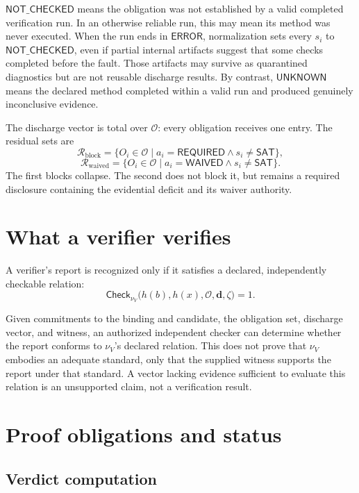 \documentclass[11pt,openany]{book}
\newcommand{\ErrorVerdict}{\mathsf{ERROR}}
\newcommand{\Waived}{\mathsf{WAIVED}}
\newcommand{\Required}{\mathsf{REQUIRED}}
\begin{document}
\(\mathsf{NOT\_CHECKED}\) means the obligation was not established by a valid
completed verification run. In an otherwise reliable run, this may mean its
method was never executed. When the run ends in \(\ErrorVerdict\), normalization
sets every \(s_i\) to \(\mathsf{NOT\_CHECKED}\), even if partial internal
artifacts suggest that some checks completed before the fault. Those artifacts
may survive as quarantined diagnostics but are not reusable discharge results.
By contrast, \(\mathsf{UNKNOWN}\) means the declared method completed within a
valid run and produced genuinely inconclusive evidence.

The discharge vector is total over \(\mathcal O\): every obligation receives
one entry. The residual sets are
\[
 \mathcal R_{\mathrm{block}}
 =\{O_i\in\mathcal O\mid a_i=\Required
       \land s_i\neq\mathsf{SAT}\},
\]
\[
 \mathcal R_{\mathrm{waived}}
 =\{O_i\in\mathcal O\mid a_i=\Waived
       \land s_i\neq\mathsf{SAT}\}.
\]
The first blocks collapse. The second does not block it, but remains a required
disclosure containing the evidential deficit and its waiver authority.

\section{What a verifier verifies}

A verifier's report is recognized only if it satisfies a declared,
independently checkable relation:
\[
 \mathsf{Check}_{\nu_V}
 \bigl(h(b),h(x),\mathcal O,\mathbf d,\zeta\bigr)=1.
\]

Given commitments to the binding and candidate, the obligation set, discharge
vector, and witness, an authorized independent checker can determine whether
the report conforms to \(\nu_V\)'s declared relation. This does not prove that
\(\nu_V\) embodies an adequate standard, only that the supplied witness
supports the report under that standard. A vector lacking evidence sufficient
to evaluate this relation is an unsupported claim, not a verification result.

\section{Proof obligations and status}

\subsection{Verdict computation}
\end{document}
